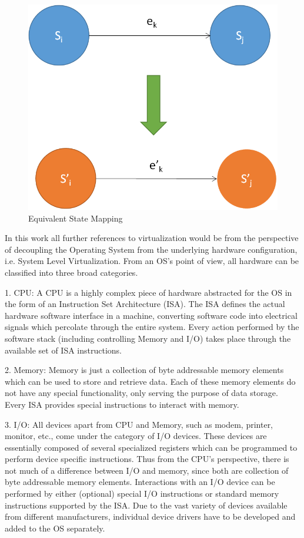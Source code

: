 \begin{figure}[H]
  \centering
  \includegraphics[scale=0.8]{figures/vir_phy_map.png}
  \caption[Equivalent State Mapping]{Equivalent State Mapping \cite{smith_nair}}
  \label{fig:statemap}
\end{figure}

In this work all further references to virtualization would be from the perspective of decoupling the Operating System from the underlying hardware configuration, i.e. System Level Virtualization. From an OS's point of view, all hardware can be classified into three broad categories.

1. CPU: A CPU is a highly complex piece of hardware abstracted for the OS in the form of an Instruction Set Architecture (ISA). The ISA defines the actual hardware software interface in a machine, converting software code into electrical signals which percolate through the entire system. Every action performed by the software stack (including controlling Memory and I/O) takes place through the available set of ISA instructions.

2. Memory: Memory is just a collection of byte addressable memory elements which can be used to store and retrieve data. Each of these memory elements do not have any special functionality, only serving the purpose of data storage. Every ISA provides special instructions to interact with memory.

3. I/O: All devices apart from CPU and Memory, such as modem, printer, monitor, etc., come under the category of I/O devices. These devices are essentially composed of several specialized registers which can be programmed to perform device specific instructions. Thus from the CPU’s perspective, there is not much of a difference between I/O and memory, since both are collection of byte addressable memory elements. Interactions with an I/O device can be performed by either (optional) special I/O instructions or standard memory instructions supported by the ISA. Due to the vast variety of devices available from different manufacturers, individual device drivers have to be developed and added to the OS separately.

